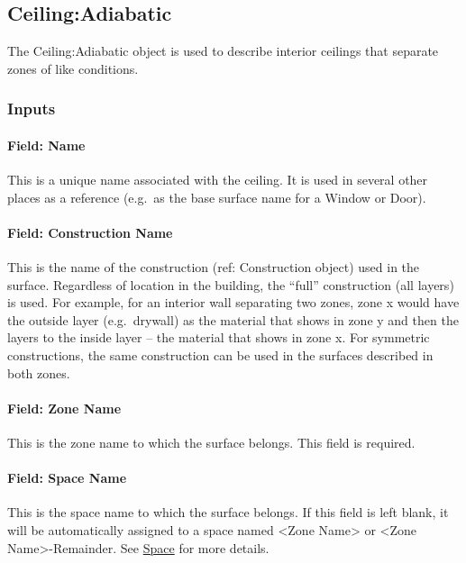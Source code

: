 \subsection{Ceiling:Adiabatic}\label{ceilingadiabatic}

The Ceiling:Adiabatic object is used to describe interior ceilings that separate zones of like conditions.

\subsubsection{Inputs}\label{inputs-9-024}

\paragraph{Field: Name}\label{field-name-5-026}

This is a unique name associated with the ceiling. It is used in several other places as a reference (e.g.~as the base surface name for a Window or Door).

\paragraph{Field: Construction Name}\label{field-construction-name-5}

This is the name of the construction (ref: Construction object) used in the surface. Regardless of location in the building, the ``full'' construction (all layers) is used. For example, for an interior wall separating two zones, zone x would have the outside layer (e.g.~drywall) as the material that shows in zone y and then the layers to the inside layer -- the material that shows in zone x. For symmetric constructions, the same construction can be used in the surfaces described in both zones.

\paragraph{Field: Zone Name}\label{field-zone-name-5-005}

This is the zone name to which the surface belongs. This field is required.

\paragraph{Field: Space Name}\label{field-space-name-5-005}

This is the space name to which the surface belongs. If this field is left blank, it will be automatically assigned to a space named <Zone Name> or <Zone Name>-Remainder. See \hyperref[space]{Space} for more details.
